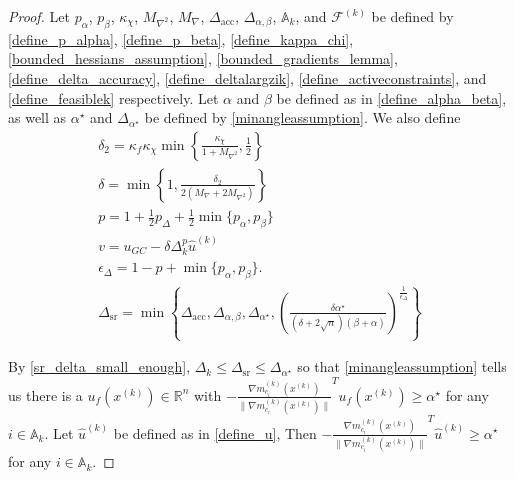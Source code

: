 \documentclass{article}
\theoremstyle{case}
\numberwithin{theorem}{subsection}
\newcommand{\activeconstraintsk}{{\mathbb A_{k}}}
\newcommand{\dacc}{{\Delta_{\textrm{acc}}}}
\newcommand{\deltalargzik}{{\Delta_{\alpha,\beta}}}
\newcommand{\dk}{\Delta_k}
\newcommand{\dsr}{{\Delta_{\textrm{sr}}}}
\newcommand{\feasiblek}{{\mathcal F^{(k)}}}
\newcommand{\gmcik}{{\nabla m_{c_i}^{(k)}\left(\xk\right)}}
\newcommand{\huk}{{{\hat u}^{(k)}}}
\newcommand{\maxgrad}{{M_{\nabla}}}
\newcommand{\maxhessian}{{M_{\nabla^2}}}
\newcommand{\minanglealpha}{{ \alpha^{\star} }}
\newcommand{\minangledelta}{{\Delta_{\alpha^{\star}}}}
\newcommand{\Rn}{\mathbb R^n}
\newcommand{\xk}{{x^{(k)}}}
\newcommand{\minangledir}{{u_f}}
\begin{document}
\begin{proof}

Let
$p_{\alpha}$,
$p_{\beta}$,
$\kappa_{\chi}$,
$\maxhessian$,
$\maxgrad$,
$\dacc$,
$\deltalargzik$,
$\activeconstraintsk$,
and $\feasiblek$
be defined by
\cref{define_p_alpha},
\cref{define_p_beta},
\cref{define_kappa_chi},
\cref{bounded_hessians_assumption},
\cref{bounded_gradients_lemma},
\cref{define_delta_accuracy},
\cref{define_deltalargzik},
\cref{define_activeconstraints},
and \cref{define_feasiblek}
respectively.
Let $\alpha$ and $\beta$ be defined as in \cref{define_alpha_beta}, as well as $\minanglealpha$ and $\minangledelta$ be defined by \cref{minangleassumption}.
We also define
\begin{align}
\delta_2 = \kappa_f \kappa_{\chi} \min\left\{ \frac{\kappa_{\chi}}{1 + \maxhessian}, \frac 1 2 \right\} \label{define_delta2} \\
\delta = \min\left\{1, \frac{\delta_2}{2\left(\maxgrad + 2\maxhessian\right)}\right\} \label{sr_define_delta} \\
p = 1 + \frac 1 2 p_{\Delta} + \frac 1 2\min\{p_{\alpha}, p_{\beta}\} \label{sr_def_p}\\
v = u_{GC} - \delta \dk^{p} \huk \label{define_v} \\
\epsilon_{\Delta} = 1-p+\min\{p_{\alpha}, p_{\beta}\}. \label{sr_def_epsilon_delta} \\
\dsr = \min\left\{
\dacc,
\deltalargzik,
\minangledelta,
\left(\frac{\delta \minanglealpha}{\left(\delta + 2\sqrt{n}\right)\left(\beta +\alpha\right)}\right)^{\frac 1 {\epsilon_{\Delta}}}
\right\} \label{define_delta_sufficient_reduction}
\end{align}

By \cref{sr_delta_small_enough}, $\dk \le \dsr \le \minangledelta$ so that \cref{minangleassumption}
tells us there is a $ \minangledir\left(\xk\right) \in \Rn$ with $-\frac {\gmcik}{\|\gmcik\|} ^T \minangledir\left(\xk\right) \ge \minanglealpha$ for any $i \in \activeconstraintsk$.
Let $\huk$ be defined as in \cref{define_u},
Then $-\frac {\gmcik}{\|\gmcik\|} ^T\huk \ge \minanglealpha$ for any $i \in \activeconstraintsk$.


\end{proof}
\end{document}
